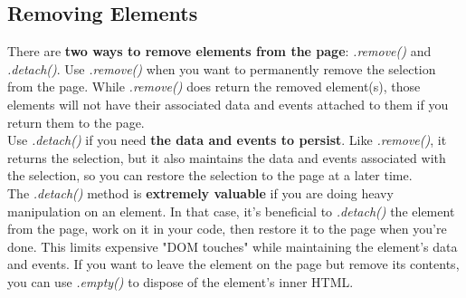 \documentclass[10pt,letterpaper]{book}
\begin{document}
\subsection{Removing Elements}
There are \textbf{two ways to remove elements from the page}: \textit{.remove()} and \textit{.detach()}. Use \textit{.remove()} when you want to permanently remove the selection from the page. While \textit{.remove()} does return the removed element(s), those elements will not have their associated data and events attached to them if you return them to the page.\\
Use \textit{.detach()} if you need \textbf{the data and events to persist}. Like \textit{.remove()}, it returns the selection, but it also maintains the data and events associated with the selection, so you can restore the selection to the page at a later time.\\
The \textit{.detach()} method is \textbf{extremely valuable} if you are doing heavy manipulation on an element. In that case, it's beneficial to \textit{.detach()} the element from the page, work on it in your code, then restore it to the page when you're done. This limits expensive "DOM touches" while maintaining the element's data and events.
If you want to leave the element on the page but remove its contents, you can use \textit{.empty()} to dispose of the element's inner HTML.
\end{document}
